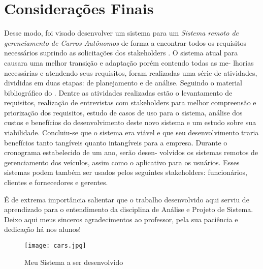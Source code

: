 

\chapter{Considera\c{c}\~{o}es Finais}


Desse modo, foi visado desenvolver um sistema para um \textit{Sistema remoto de gerenciamento de Carros Autônomos} de forma a encontrar todos os requisitos necessários suprindo as solicitações dos stakeholders .
O sistema atual para causara uma melhor transição e adaptação porém contendo todas as me- lhorias necessárias e atendendo seus requisitos, foram realizadas uma série de atividades, divididas em duas etapas: de planejamento e de análise. Seguindo o material bibliográfico do \cite{Dennis2014}.
Dentre as atividades realizadas estão o levantamento de requisitos, realização de entrevistas com stakeholders para melhor compreensão e priorização dos requisitos, estudo de casos de uso para o sistema, análise dos custos e benefícios do desenvolvimento deste novo sistema e um estudo sobre sua viabilidade. Concluiu-se que o sistema era viável e que seu desenvolvimento traria benefícios tanto tangíveis quanto intangíveis para a empresa.
Durante o cronograma estabelecido de um ano, serão desen- volvidos os sistemas remotos de gerenciamento dos veículos, assim como o aplicativo para os usuários.
 Esses sistemas podem também ser usados pelos seguintes stakeholders: funcionários, clientes e fornecedores e gerentes.

É de extrema importância salientar que o trabalho desenvolvido aqui serviu de aprendizado para o entendimento da disciplina de Análise e Projeto de Sistema. Deixo aqui meus sinceros agradecimentos ao professor, pela sua paciência e dedicação há nos alunos!



   \begin{figure}[H]
    \begin{center}
        \texttt{[image: cars.jpg]}
        \caption{Meu Sistema a ser desenvolvido} \label{sistema}
    \end{center}
   \end{figure}
